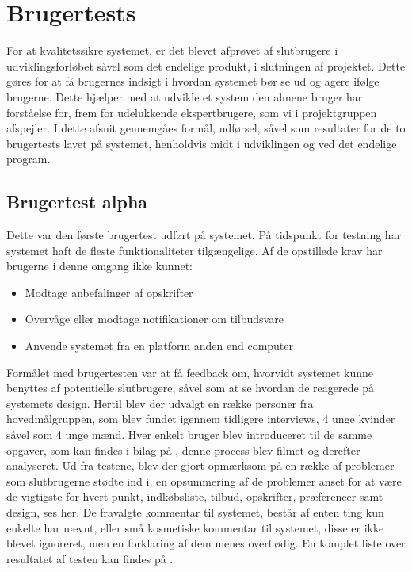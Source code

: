 \section{Brugertests}
For at kvalitetssikre systemet, er det blevet afprøvet af slutbrugere i udviklingsforløbet såvel som det endelige produkt, i slutningen af projektet.
Dette gøres for at få brugernes indsigt i hvordan systemet bør se ud og agere ifølge brugerne.
Dette hjælper med at udvikle et system den almene bruger har forståelse for, frem for udelukkende ekspertbrugere, som vi i projektgruppen afspejler.
I dette afsnit gennemgåes formål, udførsel, såvel som resultater for de to brugertests lavet på systemet, henholdvis midt i udviklingen og ved det endelige program.


\subsection{Brugertest alpha}
Dette var den første brugertest udført på systemet.
På tidspunkt for testning har systemet haft de fleste funktionaliteter tilgængelige.
Af de opstillede krav har brugerne i denne omgang ikke kunnet:
\begin{itemize}
   \item{Modtage anbefalinger af opskrifter}
   \item{Overvåge eller modtage notifikationer om tilbudsvare}
   \item{Anvende systemet fra en platform anden end computer}
\end{itemize}
Formålet med brugertesten var at få feedback om, hvorvidt systemet kunne benyttes af potentielle slutbrugere, såvel som at se hvordan de reagerede på systemets design.
Hertil blev der udvalgt en række personer fra hovedmålgruppen, som blev fundet igennem tidligere interviews, 4 unge kvinder såvel som 4 unge mænd.
Hver enkelt bruger blev introduceret til de samme opgaver, som kan findes i bilag på , denne process blev filmet og derefter analyseret.
Ud fra testene, blev der gjort opmærksom på en række af problemer som slutbrugerne stødte ind i, en opsummering af de problemer anset for at være de vigtigste for hvert punkt, indkøbsliste, tilbud, opskrifter, præferencer samt design, ses her.
De fravalgte kommentar til systemet, består af enten ting kun enkelte har nævnt, eller små kosmetiske kommentar til systemet, disse er ikke blevet ignoreret, men en forklaring af dem menes overflødig.
En komplet liste over resultatet af testen kan findes på .
